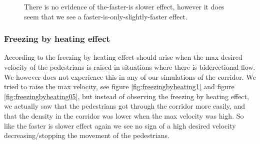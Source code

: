 \begin{figure}[h]
\caption{There is no evidence of the-faster-is slower effect, however it does seem that we see a faster-is-only-slightly-faster effect.}
\label{fig:isfasterslower}
\end{figure}


\subsubsection{Freezing by heating effect}
According to \cite{self-org} the freezing by heating effect should 
arise when the max desired velocity of the pedestrians is raised in situations where there is biderectional flow.
We however does not experience this in any of our simulations of the corridor. 
We tried to raise the max velocity, see figure \ref{fig:freezingbyheating1} and figure 
\ref{fig:freezingbyheating05}, but instead of observing the freezing 
by heating effect, we actually saw that the pedestrians got through the corridor 
more easily, and that the density in the corridor was lower when the 
max velocity was high. So like the faster is slower effect again we see no sign of a high desired velocity decreasing/stopping
 the movement of the pedestrians. 


